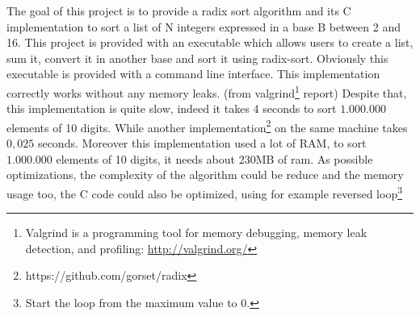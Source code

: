 \documentclass[book, nodocumentinfo]{upmethodology-document}
\begin{document}
The goal of this project is to provide a radix sort algorithm and its C implementation
to sort a list of N integers expressed in a base B between 2 and 16.
This project is provided with an executable which allows users to create a list,
sum it, convert it in another base and sort it using radix-sort.
Obviously this executable is provided with a command line interface.
This implementation correctly works without any memory leaks.
(from valgrind\footnote{Valgrind is a programming tool for memory debugging, memory leak detection, and profiling: \url{http://valgrind.org/}} report)
Despite that, this implementation is quite slow, indeed it takes 4 seconds to sort \(1.000.000\) elements of 10 digits.
While another implementation\footnote{https://github.com/gorset/radix} on the same machine takes \(0,025\) seconds.
Moreover this implementation used a lot of RAM, to sort \(1.000.000\) elements of 10 digits, it needs about 230MB of ram.
As possible optimizations, the complexity of the algorithm could be reduce and the memory usage too,
the C code could also be optimized, using for example reversed loop\footnote{Start the loop from the maximum value to 0.}
\end{document}
